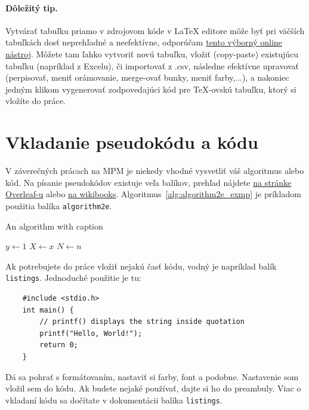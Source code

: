 \paragraph{Dôležitý tip.}
Vytvárať tabuľku priamo v zdrojovom kóde v LaTeX editore môže byť pri väčších tabuľkách dosť neprehľadné a neefektívne, odporúčam \href{https://www.tablesgenerator.com/}{tento výborný online nástroj}. Môžete tam ľahko vytvoriť novú tabuľku, vložiť (copy-paste) existujúcu tabuľku (napríklad z Excelu), či importovať z .csv, následne efektívne upravovať (perpisovať, meniť orámovanie, merge-ovať bunky, meniť farby,...), a nakoniec jedným klikom vygenerovať zodpovedajúci kód pre TeX-ovskú tabuľku, ktorý si vložíte do práce.

\section{Vkladanie pseudokódu a kódu}

V záverečných prácach na MPM je niekedy vhodné vysvetliť váš algoritmus alebo kód. Na písanie pseudokódov existuje veľa balíkov, prehľad nájdete \href{https://www.overleaf.com/learn/latex/Algorithms}{na stránke Overleaf-u} alebo \href{https://en.wikibooks.org/wiki/LaTeX/Algorithms#The_algorithm_environment}{na wikibooks}. Algoritmus~\ref{alg:algorithm2e_exmp} je príkladom použitia balíka \verb|algorithm2e|.

\begin{algorithm}[!h]
	\caption{An algorithm with caption}\label{alg:algorithm2e_exmp}
	$y \gets 1$\;
	$X \gets x$\;
	$N \gets n$\;
\end{algorithm}

Ak potrebujete do práce vložiť nejakú časť kódu, vodný je napríklad balík \verb|listings|. Jednoduché použitie je tu:
\begin{lstlisting}
	#include <stdio.h>
	int main() {
		// printf() displays the string inside quotation
		printf("Hello, World!");
		return 0;
	}
\end{lstlisting}

Dá sa pohrať s formátovaním, nastaviť si farby, font a podobne. Nastavenie som vložil sem do kódu. Ak budete nejaké používať, dajte si ho do preambuly. Viac o vkladaní kódu sa dočítate v dokumentácii balíka \verb|listings|.

